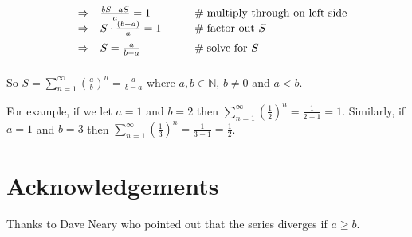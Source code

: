 \documentclass[11pt, oneside]{article}   	%
\begin{document}
\begin{equation*}
\begin{array}{lllll}
&\Rightarrow& \frac{bS - aS}{a} = 1                                                                                                                            &\qquad  \mathrel{\#} \text{multiply through on left side}                 \\
\vspace{2.0mm}
&\Rightarrow& S \cdot \frac{(b - a)} {a} = 1                                                                                                                 &\qquad  \mathrel{\#} \text{factor out $S$}                                       \\
\vspace{2.0mm}
&\Rightarrow& S  = \frac{a}{b - a}                                                                                                                               &\qquad  \mathrel{\#} \text{solve for $S$}
\end{array}
\end{equation*}

\bigskip
\noindent
So $S = \sum\limits_{n = 1}^\infty (\frac{a}{b})^n  =  \frac{a}{b -a}$ where $a,b \in \mathbb{N}$, $b \neq 0$ and $a < b$.  

\bigskip
\noindent
For example, if we  let $a =1$ and $b =2$ then $\sum\limits_{n = 1}^\infty (\frac{1}{2})^n  =  \frac{1}{2-1} = 1$. Similarly, if $a =1$ and $b = 3$ then 
$\sum\limits_{n = 1}^\infty (\frac{1}{3})^n  =  \frac{1}{3-1} = \frac{1}{2}$. 

\bigskip
\noindent
\section*{Acknowledgements}

Thanks to Dave Neary who pointed out that the series diverges if $a \geq b$.
\end{document}
